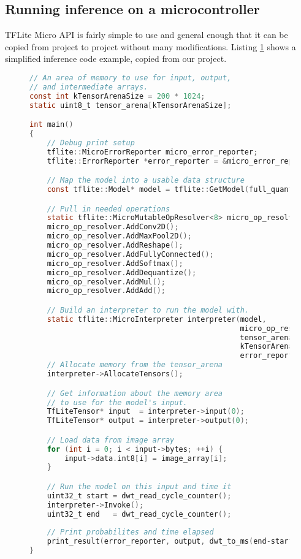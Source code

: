 \subsection{ Running inference on a microcontroller}

TFLite Micro API is fairly simple to use and general enough that it can be copied from project to project without many modifications.
Listing \ref{inference_code} shows a simplified inference code example, copied from our project.

\lstset{style=mystyle}
\begin{figure}[ht]
\begin{lstlisting}[language=C]
// An area of memory to use for input, output, 
// and intermediate arrays.
const int kTensorArenaSize = 200 * 1024;
static uint8_t tensor_arena[kTensorArenaSize];

int main() 
{
    // Debug print setup
    tflite::MicroErrorReporter micro_error_reporter;
    tflite::ErrorReporter *error_reporter = &micro_error_reporter;

    // Map the model into a usable data structure
    const tflite::Model* model = tflite::GetModel(full_quant_tflite);

    // Pull in needed operations
    static tflite::MicroMutableOpResolver<8> micro_op_resolver;
    micro_op_resolver.AddConv2D();
    micro_op_resolver.AddMaxPool2D();
    micro_op_resolver.AddReshape();
    micro_op_resolver.AddFullyConnected();
    micro_op_resolver.AddSoftmax();
    micro_op_resolver.AddDequantize();
    micro_op_resolver.AddMul();
    micro_op_resolver.AddAdd();

    // Build an interpreter to run the model with.
    static tflite::MicroInterpreter interpreter(model, 
                                                micro_op_resolver, 
                                                tensor_arena,
                                                kTensorArenaSize, 
                                                error_reporter);
    // Allocate memory from the tensor_arena
    interpreter->AllocateTensors();

    // Get information about the memory area 
    // to use for the model's input.
    TfLiteTensor* input  = interpreter->input(0);
    TfLiteTensor* output = interpreter->output(0);

    // Load data from image array
    for (int i = 0; i < input->bytes; ++i) {
        input->data.int8[i] = image_array[i];
    }

    // Run the model on this input and time it
    uint32_t start = dwt_read_cycle_counter();
    interpreter->Invoke();
    uint32_t end   = dwt_read_cycle_counter();
    
    // Print probabilites and time elapsed
    print_result(error_reporter, output, dwt_to_ms(end-start));
}
\end{lstlisting}
\label{inference_code}
\end{figure}

